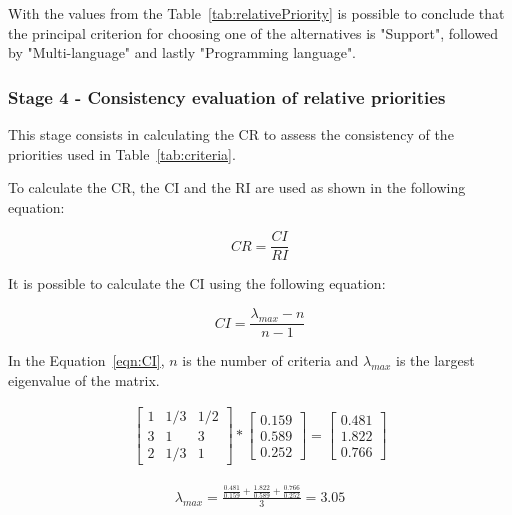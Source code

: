 With the values from the Table~\ref{tab:relativePriority} is possible to conclude that the principal criterion for choosing one of the alternatives is "Support", followed by "Multi-language" and lastly "Programming language".

\subsubsection{Stage 4 - Consistency evaluation of relative priorities}

This stage consists in calculating the \gls{CR} to assess the consistency of the priorities used in Table~\ref{tab:criteria}.

To calculate the \gls{CR}, the \gls{CI} and the \gls{RI} are used as shown in the following equation:

\begin{equation}
    CR = \frac{CI}{RI}
\end{equation}

It is possible to calculate the \gls{CI} using the following equation:

\begin{equation}
    \label{eqn:CI}
    CI = \frac{\lambda_{max}-n}{n-1}
\end{equation}

In the Equation~\ref{eqn:CI}, $n$ is the number of criteria and $\lambda_{max}$ is the largest eigenvalue of the matrix.

\begin{gather}
    \label{eqn:preLambda}
    \begin{bmatrix}
        1 & 1/3 & 1/2 \\
        3 & 1 & 3 \\
        2 & 1/3 & 1
    \end{bmatrix}
    *
    \begin{bmatrix}
      0.159 \\
      0.589 \\
      0.252
    \end{bmatrix}
      =
    \begin{bmatrix}
      0.481 \\
      1.822 \\
      0.766
    \end{bmatrix}
\end{gather}


\begin{gather}
    \label{eqn:lambdaMax}
    \lambda_{max} =
    \frac{\frac{0.481}{0.159} + \frac{1.822}{0.589} + \frac{0.766}{0.252}}{3}
    = 3.05
\end{gather}

